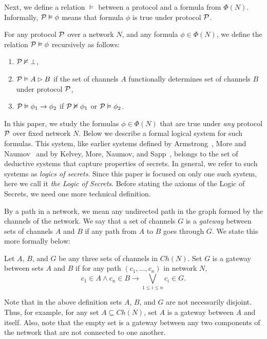 \documentclass{llncs}
\newcommand{\pp}{{\cal P}}
\begin{document}
Next, we define a relation $\vDash$ between a protocol and a formula from $\Phi(N)$.  Informally, $\pp \vDash\phi$ means that formula $\phi$ is true under protocol $\pp$. 
\begin{definition}\label{}
For any protocol $\pp$ over a network $N$, and any formula $\phi\in\Phi(N)$, we define the relation $\pp \vDash\phi$ recursively as follows:
\begin{enumerate}
\item $\pp \nvDash \bot$,
\item $\pp \vDash A\rhd B$ if the set of channels $A$ functionally determines set of channels $B$ under protocol $\pp$,
\item $\pp \vDash \phi_1\rightarrow\phi_2$ if $\pp \nvDash \phi_1$ or $\pp \vDash \phi_2$.
\end{enumerate}
\end{definition}
In this paper, we study the formulas $\phi \in \Phi(N)$ that are true under {\em any} protocol $\pp$ over fixed network $N$. 
Below we describe a formal logical system for such formulas.  This system, like earlier systems defined by Armstrong~\cite{a74}, More and Naumov~\cite{mn09,mn09a,mn10clima} and by Kelvey, More, Naumov, and Sapp~\cite{kmns10},  belongs to the set of deductive systems that capture properties of secrets.  In general, we refer to such systems as {\em logics of secrets}. Since this paper is focused on only one such system, here we call it {\em the Logic of Secrets}. Before stating the axioms of the Logic of Secrets, we need one more technical definition.

By a path in a network, we mean any undirected path in the graph formed by the channels of the network.
We say that a set of channels $G$ is a {\em gateway} between sets of channels $A$ and $B$ if any path from $A$ to $B$ goes through $G$.  We state this more formally below:

\begin{definition}\label{gateway}
Let $A$, $B$, and $G$ be any three sets of channels in $Ch(N)$. Set $G$ is a gateway between sets $A$ and $B$ if
for any path $(c_1,\dots,c_n)$ in network $N$,
\begin{equation}\label{path cond}
c_1\in A \wedge c_n\in B \rightarrow \bigvee_{1\le i\le n} c_i\in G.
\end{equation}
\end{definition}
Note that in the above definition sets $A$, $B$, and $G$ are not necessarily disjoint. Thus, for example, for any set $A\subseteq Ch(N)$,
set $A$ is a gateway between $A$ and itself. Also, note that the empty set is a gateway between any two components of the network that are not connected to one another.
\end{document}
